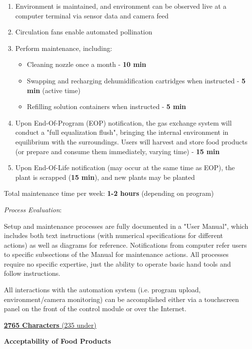 \documentclass{report}
\begin{document}
\begin{enumerate}
    \item Environment is maintained, and environment can be observed live at a computer terminal via sensor data and camera feed
    \item Circulation fans enable automated pollination
    \item Perform maintenance, including:
    \begin{itemize}
        \item Cleaning nozzle once a month - \textbf{10 min}
        \item Swapping and recharging dehumidification cartridges when instructed - \textbf{5 min} (active time)
        \item Refilling solution containers when instructed - \textbf{5 min}
    \end{itemize}
    \item Upon End-Of-Program (EOP) notification, the gas exchange system will conduct a "full equalization flush", bringing the internal environment in equilibrium with the surroundings. Users will harvest and store food products (or prepare and consume them immediately, varying time) - \textbf{15 min}
    \item Upon End-Of-Life notification (may occur at the same time as EOP), the plant is scrapped (\textbf{15 min}), and new plants may be planted
\end{enumerate}

Total maintenance time per week: \textbf{1-2 hours} (depending on program)

\textit{Process Evaluation}:

Setup and maintenance processes are fully documented in a "User Manual", which includes both text instructions (with numerical specifications for different actions) as well as diagrams for reference. Notifications from computer refer users to specific subsections of the Manual for maintenance actions. All processes require no specific expertise, just the ability to operate basic hand tools and follow instructions.

All interactions with the automation system (i.e. program upload, environment/camera monitoring) can be accomplished either via a touchscreen panel on the front of the control module or over the Internet.

\uline{\textbf{2765 Characters} (235 under)}

\newpage

\textbf{Acceptability of Food Products}
\label{sec:acceptability-products}
\end{document}
